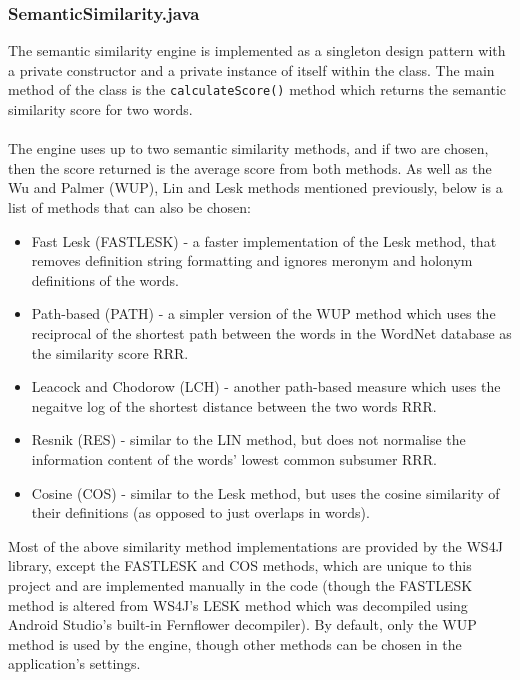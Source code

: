 \documentclass[11pt]{article}
\begin{document}
\subsubsection{SemanticSimilarity.java}

The semantic similarity engine is implemented as a singleton design pattern with a private constructor and a private instance of itself within the class. The main method of the class is the \texttt{calculateScore()} method which returns the semantic similarity score for two words.
\\
\\
The engine uses up to two semantic similarity methods, and if two are chosen, then the score returned is the average score from both methods. As well as the Wu and Palmer (WUP), Lin and Lesk methods mentioned previously, below is a list of methods that can also be chosen: 

\begin{itemize}
\item Fast Lesk (FASTLESK) - a faster implementation of the Lesk method, that removes definition string formatting and ignores meronym and holonym definitions of the words.

\item Path-based (PATH) - a simpler version of the WUP method which uses the reciprocal of the shortest path between the words in the WordNet database as the similarity score RRR.

\item Leacock and Chodorow (LCH) - another path-based measure which uses the negaitve log of the shortest distance between the two words RRR.

\item Resnik (RES) - similar to the LIN method, but does not normalise the information content of the words' lowest common subsumer RRR.

\item Cosine (COS) - similar to the Lesk method, but uses the cosine similarity of their definitions (as opposed to just overlaps in words).
\end{itemize}

Most of the above similarity method implementations are provided by the WS4J library, except the FASTLESK and COS methods, which are unique to this project and are implemented manually in the code (though the FASTLESK method is altered from WS4J's LESK method which was decompiled using Android Studio's built-in Fernflower decompiler). By default, only the WUP method is used by the engine, though other methods can be chosen in the application's settings.
\end{document}
